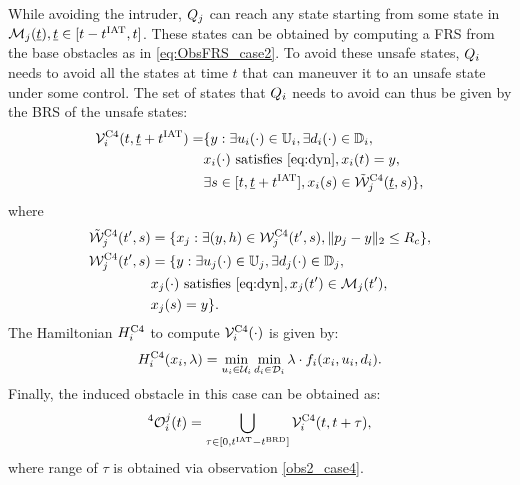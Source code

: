 \begin{itemize}[leftmargin=*]
While avoiding the intruder, $Q_j$ can reach any state starting from some state in $\mathcal{M}_j(\underline{t}), \underline{t} \in [t-t^\text{IAT}, t]$. These states can be obtained by computing a FRS from the base obstacles as in \eqref{eq:ObsFRS_case2}. To avoid these unsafe states, $Q_i$ needs to avoid all the states at time $t$ that can maneuver it to an unsafe state under some control. The set of states that $Q_i$ needs to avoid can thus be given by the BRS of the unsafe states:
\begin{equation}  \label{eq:ObsBRS_case4}
\begin{aligned}
\brs^{\text{C4}}_{i}(t, \tsa + \iat) = & \{y: \exists \ctrl_i(\cdot) \in \cfset_i, \exists \dstb_i(\cdot) \in \dfset_i, \\
& \state_i(\cdot) \text{ satisfies \eqref{eq:dyn}}, \state_i(t) = y, \\
& \exists s \in [t, \tsa + \iat], \state_i(s) \in \tilde{\frs}_j^{\text{C4}}(\tsa, s)\},
\end{aligned}
\end{equation}
where
\begin{equation} \label{eq:ObsFRS_case4}
\begin{aligned}
\tilde{\frs}_{j}^{\text{C4}}(t', s) & = \{\state_j: \exists (y, h) \in \frs_j^{\text{C4}}(t', s), \|\pos_j - y\|_2 \le \rc \},\\
\frs_j^{\text{C4}}(t', s) & = \{y: \exists \ctrl_j(\cdot) \in \cfset_j, \exists \dstb_j(\cdot) \in \dfset_j, \\
& \state_j(\cdot) \text{ satisfies \eqref{eq:dyn}}, \state_j(t') \in \boset_j(t'), \\
& \state_j(s) = y\}.
\end{aligned}
\end{equation} 
The Hamiltonian $H^{\text{C4}}_{i}$ to compute $\mathcal{V}^{\text{C4}}_{i}(\cdot)$ is given by:
\begin{equation} \label{eqn:BRS_obsham}
\ham^{\text{C4}}_{i}(\state_i, \costate) = \min_{\ctrl_i \in \cset_i} \min_{\dstb_i \in \dset_i} \costate \cdot f_i (\state_i, \ctrl_i, \dstb_i).
\end{equation}
Finally, the induced obstacle in this case can be obtained as:
\begin{equation} \label{eq:intruderObs_case4_alt1} 
^4\ioset_i^j(t) = \bigcup_{\tau \in [0, \iat - \brd]} \brs^{\text{C4}}_{i}(t, t + \tau),
\end{equation}
where range of $\tau$ is obtained via observation \ref{obs2_case4}.


\end{itemize}
